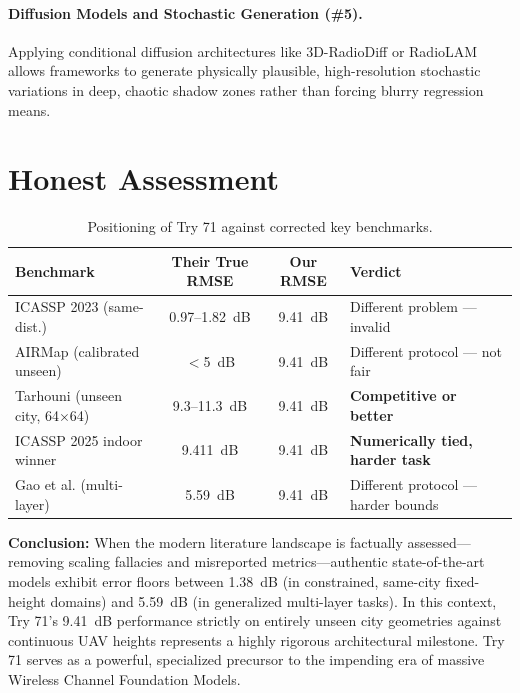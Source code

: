 \documentclass[11pt,a4paper]{article}
\newcommand{\better}[1]{\textcolor{good}{\textbf{#1}}}
\begin{document}
\paragraph{Diffusion Models and Stochastic Generation (\#5).}
Applying conditional diffusion architectures like 3D-RadioDiff or RadioLAM \cite{radiolam2025} \cite{radiodiff2025} allows frameworks to generate physically plausible, high-resolution stochastic variations in deep, chaotic shadow zones rather than forcing blurry regression means.

\section{Honest Assessment}
\label{sec:assessment}

\begin{table}[h!]
\centering
\caption{Positioning of Try 71 against corrected key benchmarks.}
\label{tab:assessment}
\begin{tabularx}{\textwidth}{Xccl}
\toprule
\textbf{Benchmark} & \textbf{Their True RMSE} & \textbf{Our RMSE} & \textbf{Verdict} \\
\midrule
ICASSP 2023 (same-dist.) & 0.97--1.82~dB & 9.41~dB & Different problem --- invalid \\
AIRMap (calibrated unseen) & $<$5~dB & 9.41~dB & Different protocol --- not fair \\
Tarhouni (unseen city, 64$\times$64) & 9.3--11.3~dB & 9.41~dB & \better{Competitive or better} \\
ICASSP 2025 indoor winner & 9.411~dB & 9.41~dB & \better{Numerically tied, harder task} \\
Gao et al. (multi-layer) & 5.59~dB & 9.41~dB & Different protocol --- harder bounds \\
\bottomrule
\end{tabularx}
\end{table}

\textbf{Conclusion:} When the modern literature landscape is factually assessed—removing scaling fallacies and misreported metrics—authentic state-of-the-art models exhibit error floors between 1.38~dB (in constrained, same-city fixed-height domains) and 5.59~dB (in generalized multi-layer tasks). In this context, Try 71's 9.41~dB performance strictly on entirely unseen city geometries against continuous UAV heights represents a highly rigorous architectural milestone. Try 71 serves as a powerful, specialized precursor to the impending era of massive Wireless Channel Foundation Models.
\end{document}
